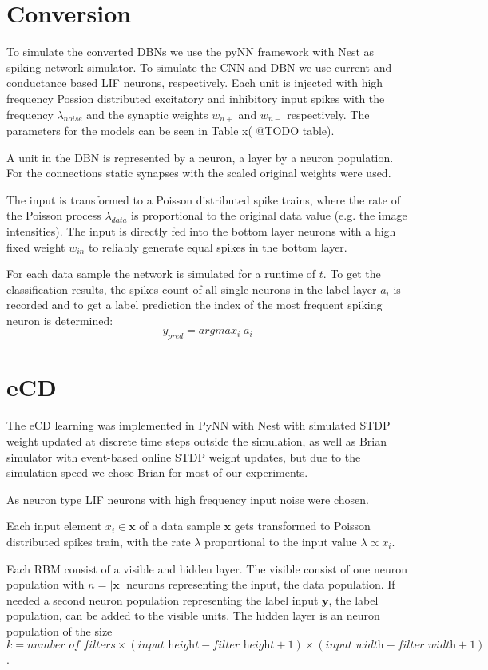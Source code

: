 \section{Conversion}

To simulate the converted DBNs we use the pyNN framework with Nest as spiking network simulator.
To simulate the CNN and DBN we use current and conductance based LIF neurons, respectively.
Each unit is injected with high frequency Possion distributed excitatory and inhibitory input spikes with the frequency $\lambda_{noise}$ and the synaptic weights $w_{n+}$ and $w_{n-}$ respectively.
The parameters for the models can be seen in Table x( @TODO table).

A unit in the DBN is represented by a neuron, a layer by a neuron population.
For the connections static synapses with the scaled original weights were used. 

The input is transformed to a Poisson distributed spike trains, where the rate of the Poisson process $\lambda_{data}$ is proportional to the original data value (e.g. the image intensities). 
The input is directly fed into the bottom layer neurons with a high fixed weight $w_{in}$ to reliably generate equal spikes in the bottom layer.    

For each data sample the network is simulated for a runtime of $t$. 
To get the classification results, the spikes count of all single neurons in the label layer $a_i$ is recorded and to get a label prediction the index of the most frequent spiking neuron is determined:
\[
y_{pred} = argmax_i \; a_i
\]


\section{eCD}

The eCD learning was implemented in PyNN with Nest with simulated STDP weight updated at discrete time steps outside the simulation, as well as Brian simulator with event-based online STDP weight updates, but due to the simulation speed we chose Brian for most of our experiments.

As neuron type LIF neurons with high frequency input noise were chosen.

Each input element $x_i \in \textbf{x}$ of a data sample $\textbf{x}$ gets transformed to Poisson distributed spikes train, with the rate $\lambda$ proportional to the input value $\lambda \propto x_i$. 

Each RBM consist of a visible and hidden layer. 
The visible consist of one neuron population with $n = |\textbf{x}|$ neurons representing the input, the data population. 
If needed a second neuron population representing the label input $\textbf{y}$, the label population, can be added to the visible units.
The hidden layer is an neuron population of the size  $ k = \textit{number of filters} \times (\textit{input height} - \textit{filter height} + 1) \times (\textit{input width} - \textit{filter width} + 1)$.

